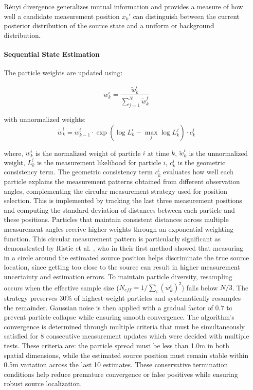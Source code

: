 \documentclass[../report.tex]{subfiles}
\begin{document}
    Rényi divergence generalizes mutual information and provides a measure of how well a candidate measurement position $x_k'$ can distinguish between the current posterior distribution of the source state and a uniform or background distribution.

    \paragraph{Sequential State Estimation}
    The particle weights are updated using:

    \begin{equation}
    w_k^i = \frac{\tilde{w}_k^i}{\sum_{j=1}^N \tilde{w}_k^j}
    \end{equation}

    with unnormalized weights:
    \begin{equation}
    \tilde{w}_k^i = w_{k-1}^i \cdot \exp(\log L_k^i - \max_j \log L_k^j) \cdot c_k^i
    \end{equation}

    where, $w_k^i$ is the normalized weight of particle $i$ at time $k$, $\tilde{w}_k^i$ is the unnormalized weight, $L_k^i$ is the measurement likelihood for particle $i$, $c_k^i$ is the geometric 
    consistency term. The geometric consistency term $c_k^i$ evaluates how well each particle explains the measurement patterns obtained from different observation angles, complementing the circular 
    measurement strategy used for position selection. This is implemented by tracking the last three measurement positions and computing the standard deviation of distances between each particle and 
    these positions. Particles that maintain consistent distances across multiple measurement angles receive higher weights through an exponential weighting function. This circular measurement pattern 
    is particularly significant as demonstrated by Ristic et al. \cite{Ristic2007AnIG}, who in their first method showed that measuring in a circle around the estimated source position helps 
    discriminate the true source location, since getting too close to the source can result in higher measurement uncertainty and estimation errors. To maintain particle diversity, resampling occurs when the effective sample size ($N_{eff} = 1/\sum_i(w_k^i)^2$) falls below $N/3$. The strategy preserves $30\%$ of highest-weight
    particles and systematically resamples the remainder. Gaussian noise is then applied with a gradual factor of $0.7$ to prevent particle collapse while ensuring 
    smooth convergence. The algorithm's convergence is determined through multiple criteria that must be simultaneously satisfied for 8 consecutive measurement updates which were decided with
    multiple tests. These criteria are: the particle spread must be less than 1.0m in both spatial dimensions, while the estimated source position must remain stable within 0.5m variation across 
    the last 10 estimates. These conservative termination conditions help reduce premature convergence or false positives while ensuring robust source localization.
\end{document}
